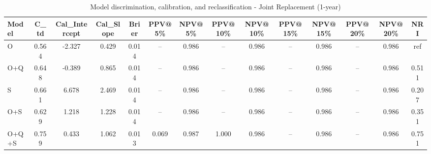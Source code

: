 \begin{table}[htbp]
\centering
\small
\caption{Model discrimination, calibration, and reclassification - Joint Replacement (1-year)}
\label{tab:perf_joint_1y}
\begin{tabular}{lccccccccccccc}
\toprule
Model & C\_td & Cal\_Intercept & Cal\_Slope & Brier & PPV@5\% & NPV@5\% & PPV@10\% & NPV@10\% & PPV@15\% & NPV@15\% & PPV@20\% & NPV@20\% & NRI \\
\midrule
O & 0.564 & -2.327 & 0.429 & 0.014 & -- & 0.986 & -- & 0.986 & -- & 0.986 & -- & 0.986 & ref \\
O+Q & 0.648 & -0.389 & 0.865 & 0.014 & -- & 0.986 & -- & 0.986 & -- & 0.986 & -- & 0.986 & 0.511 \\
S & 0.661 & 6.678 & 2.469 & 0.014 & -- & 0.986 & -- & 0.986 & -- & 0.986 & -- & 0.986 & 0.207 \\
O+S & 0.629 & 1.218 & 1.228 & 0.014 & -- & 0.986 & -- & 0.986 & -- & 0.986 & -- & 0.986 & 0.351 \\
O+Q+S & 0.759 & 0.433 & 1.062 & 0.013 & 0.069 & 0.987 & 1.000 & 0.986 & -- & 0.986 & -- & 0.986 & 0.751 \\
\bottomrule
\end{tabular}
\end{table}